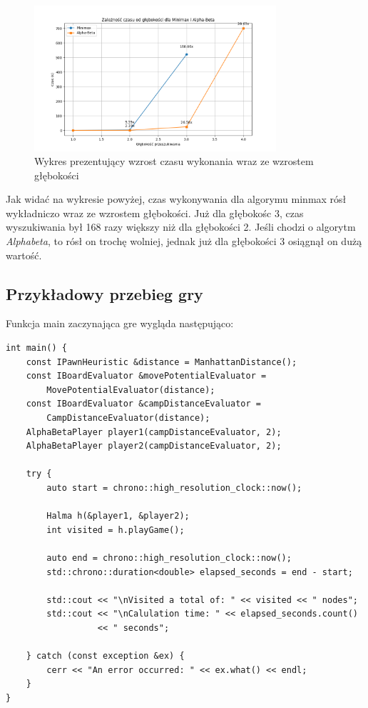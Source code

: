 \documentclass[a4paper, 12pt]{article}
\begin{document}
\begin{figure}[H]
    \centering
    \includegraphics[width=0.8\textwidth]{images/time-depth.png} 
    \caption{Wykres prezentujący wzrost czasu wykonania wraz ze wzrostem głębokości}
\end{figure}
Jak widać na wykresie powyżej, 
czas wykonywania dla algorymu minmax rósł wykładniczo wraz ze wzrostem głębokości.
Już dla głębokośc 3, czas wyszukiwania był 168 razy większy niż dla głębokości 2.
Jeśli chodzi o algorytm \textit{Alphabeta}, to 
rósł on trochę wolniej, jednak już dla głębokości 3
osiągnął on dużą wartość.


\subsection{Przykładowy przebieg gry}
Funkcja main zaczynająca gre wygląda następująco:
\begin{lstlisting}
int main() {
    const IPawnHeuristic &distance = ManhattanDistance();
    const IBoardEvaluator &movePotentialEvaluator =
        MovePotentialEvaluator(distance);
    const IBoardEvaluator &campDistanceEvaluator =
        CampDistanceEvaluator(distance);
    AlphaBetaPlayer player1(campDistanceEvaluator, 2);
    AlphaBetaPlayer player2(campDistanceEvaluator, 2);

    try {
        auto start = chrono::high_resolution_clock::now();

        Halma h(&player1, &player2);
        int visited = h.playGame();

        auto end = chrono::high_resolution_clock::now();
        std::chrono::duration<double> elapsed_seconds = end - start;

        std::cout << "\nVisited a total of: " << visited << " nodes";
        std::cout << "\nCalulation time: " << elapsed_seconds.count()
                  << " seconds";

    } catch (const exception &ex) {
        cerr << "An error occurred: " << ex.what() << endl;
    }
}
\end{lstlisting}
\end{document}

